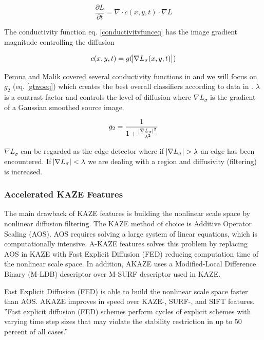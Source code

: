 \documentclass[english,12pt,a4paper,pdftex,elec,utf8, table]{aaltothesis}
\begin{document}
\begin{equation}
  \label{nonlineareq}
  \frac{\partial L}{\partial t} = \nabla \cdot c(x,y,t)\cdot\nabla L
\end{equation}
\cite{Alcantarilla2012}

The conductivity function eq. \ref{conductivityfunceq} has the image gradient magnitude controlling the diffusion

\begin{equation}
  \label{conductivityfunceq}
c(x,y,t)=g(\abs{\nabla L_\sigma(x,y,t)})
\end{equation}

Perona and Malik covered several conductivity functions in \cite{Perona1990} and we will focus on $g_2$ (eq. \ref{gtwoeq}) which creates the best overall classifiers according to data in \cite{Alcantarilla2012}. $\lambda$ is a contrast factor and controls the level of diffusion where $\nabla L_{\sigma}$ is the gradient of a Gaussian smoothed source image.

\begin{equation}
  \label{gtwoeq}
g_2 = \frac{1}{1 + \frac{\abs{\nabla L_\sigma}^{2}}{\lambda^{2}}}
\end{equation}

$\nabla L_{\sigma}$ can be regarded as the edge detector where if $\abs{\nabla L_{\sigma}} > \lambda$ an edge has been encountered. If $\abs{\nabla L_{\sigma}} < \lambda$ we are dealing with a region and diffusivity (filtering) is increased. \cite{Weickert1998}

\subsubsection{Accelerated KAZE Features}
The main drawback of KAZE features is building the nonlinear scale space by nonlinear diffusion filtering.  The KAZE method of choice is Additive Operator Scaling (AOS). AOS requires solving a large system of linear equations, which is computationally intensive. A-KAZE features solves this problem by replacing AOS in KAZE with Fast Explicit Diffusion (FED) reducing computation time of the nonlinear scale space. In addition, AKAZE uses a Modified-Local Difference Binary (M-LDB) descriptor over M-SURF descriptor used in KAZE.

Fast Explicit Diffusion (FED) is able to build the nonlinear scale space faster than AOS. AKAZE improves in speed over KAZE-, SURF-, and SIFT features. ''Fast explicit diffusion (FED) schemes perform cycles of explicit schemes with varying time step sizes that may violate the stability restriction in up to 50 percent of all cases.''\cite{Grewenig2010}
\end{document}

